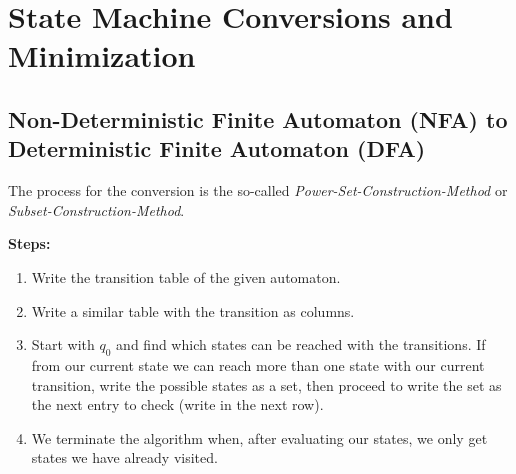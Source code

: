 \begin{center}
\end{center}

\section{State Machine Conversions and Minimization}

\subsection{Non-Deterministic Finite Automaton (NFA) to Deterministic Finite Automaton (DFA)}

The process for the conversion is the so-called \emph{Power-Set-Construction-Method} or 
\emph{Subset-Construction-Method}. 

\textbf{Steps:}

\begin{enumerate}

    \item Write the transition table of the given automaton.

    \item Write a similar table with the transition as columns. 

    \item Start with \(q_0\) and find which states can be reached with the transitions. 
    If from our current state we can reach more than one state with our current transition, write the 
    possible states as a set, then proceed to write the set as the next entry to check 
    (write in the next row). 

    \item We terminate the algorithm when, after evaluating our states, we only get states we have already 
    visited.

\end{enumerate}

